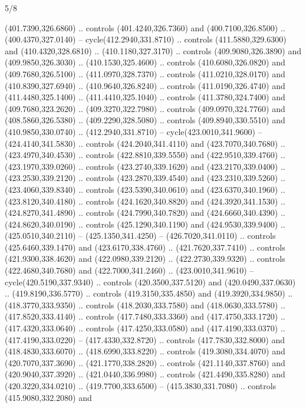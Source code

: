 \begin{flagdescription}{5/8}
\begin{scope}[xshift=0.5\flaglength,yshift=0.5\flagwidth,scale=\flagwidth/475.63]
\begin{scope}[y=0.8pt, x=0.8pt, yscale=-1, xscale=1,shift={(-450,-300)}]
\begin{scope}[cm={{1.0,0.0,0.0,1.0,(-0.0002,0.12556)}},cm={{1.0,0.0,0.0,1.0,(0.00179,0.0)}}]
\begin{scope}[fill=c00863d]
  (401.7390,326.6860) .. controls (401.4240,326.7360) and (400.7100,326.8500) ..
  (400.4370,327.0140) -- cycle(412.2940,331.8710) .. controls
  (411.5880,329.6300) and (410.4320,328.6810) .. (410.1180,327.3170) .. controls
  (409.9080,326.3890) and (409.9850,326.3030) .. (410.1530,325.4600) .. controls
  (410.6080,326.0820) and (409.7680,326.5100) .. (411.0970,328.7370) .. controls
  (411.0210,328.0170) and (410.8390,327.6940) .. (410.9640,326.8240) .. controls
  (411.0190,326.4740) and (411.4480,325.1400) .. (411.4410,325.1040) .. controls
  (411.3780,324.7400) and (409.7680,323.2620) .. (409.3270,322.7980) .. controls
  (409.0970,324.7760) and (408.5860,326.5380) .. (409.2290,328.5080) .. controls
  (409.8940,330.5510) and (410.9850,330.0740) .. (412.2940,331.8710) --
  cycle(423.0010,341.9600) -- (424.4140,341.5830) .. controls
  (424.2040,341.4110) and (423.7070,340.7680) .. (423.4970,340.4530) .. controls
  (422.8810,339.5550) and (422.9510,339.4760) .. (423.1970,339.0260) .. controls
  (423.2740,339.1620) and (423.2170,339.0400) .. (423.2530,339.2120) .. controls
  (423.2870,339.4540) and (423.2310,339.5260) .. (423.4060,339.8340) .. controls
  (423.5390,340.0610) and (423.6370,340.1960) .. (423.8120,340.4180) .. controls
  (424.1620,340.8820) and (424.3920,341.1530) .. (424.8270,341.4890) .. controls
  (424.7990,340.7820) and (424.6660,340.4390) .. (424.8620,340.0190) .. controls
  (425.1290,340.1190) and (424.9530,339.9400) .. (425.0510,340.2110) --
  (425.1350,341.4250) -- (426.7020,341.0110) .. controls (425.6460,339.1470) and
  (423.6170,338.4760) .. (421.7620,337.7410) .. controls (421.9300,338.4620) and
  (422.0980,339.2120) .. (422.2730,339.9320) .. controls (422.4680,340.7680) and
  (422.7000,341.2460) .. (423.0010,341.9610) -- cycle(420.5190,337.9340) ..
  controls (420.3500,337.5120) and (420.0490,337.0630) .. (419.8190,336.5770) ..
  controls (419.3150,335.4850) and (419.3920,334.9850) .. (418.3770,333.9350) ..
  controls (418.2030,333.7580) and (418.0630,333.5780) .. (417.8520,333.4140) ..
  controls (417.7480,333.3360) and (417.4750,333.1720) .. (417.4320,333.0640) ..
  controls (417.4250,333.0580) and (417.4190,333.0370) .. (417.4190,333.0220) --
  (417.4330,332.8720) .. controls (417.7830,332.8000) and (418.4830,333.6070) ..
  (418.6990,333.8220) .. controls (419.3080,334.4070) and (420.7070,337.3690) ..
  (421.1770,338.2820) .. controls (421.1140,337.8760) and (420.9040,337.3920) ..
  (421.0440,336.9980) .. controls (421.4490,335.8280) and (420.3220,334.0210) ..
  (419.7700,333.6500) -- (415.3830,331.7080) .. controls (415.9080,332.2080) and

\end{scope}
\end{scope}
\end{scope}
\end{scope}
\end{flagdescription}
